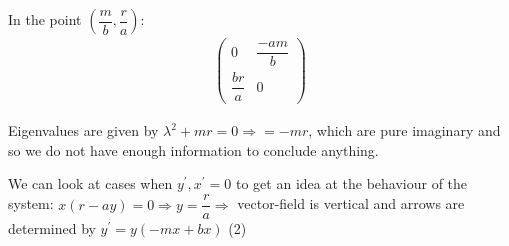 \par\bigskip
\noindent In the point $\left(\dfrac{m}{b}, \dfrac{r}{a}\right)$:
\begin{equation*}
  \begin{gathered}
    \begin{pmatrix}0&\dfrac{-am}{b}\\\dfrac{br}{a}&0\end{pmatrix}
  \end{gathered}
\end{equation*}\par
\noindent Eigenvalues are given by $\lambda^2+mr = 0\Rightarrow=-mr$, which are pure imaginary and so we do not have enough information to conclude anything.
\par\bigskip
\noindent We can look at cases when $y^{\prime},x^{\prime} = 0$ to get an idea at the behaviour of the system: $x(r-ay) = 0\Rightarrow y= \dfrac{r}{a}\Rightarrow$ vector-field is vertical and arrows are determined by $y^{\prime} = y(-mx+bx)$ (2)

